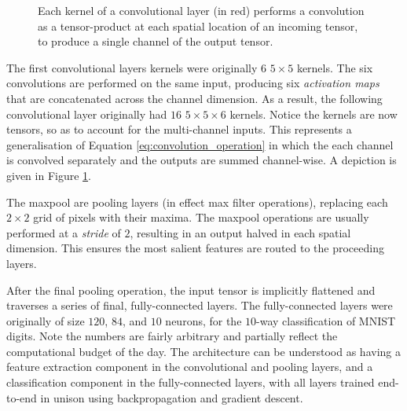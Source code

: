 \begin{figure}
\caption{Each kernel of a convolutional layer (in red) performs a convolution as a tensor-product at each spatial location of an incoming tensor, to produce a single channel of the output tensor.}
\label{fig:convolutional_layer}
\end{figure}

The first convolutional layers kernels were originally $6$ $5 \times 5$ kernels. The six convolutions are performed on the same input, producing six \emph{activation maps} that are concatenated across the channel dimension. As a result, the following convolutional layer originally had $16$ $5 \times 5 \times 6$ kernels. Notice the kernels are now tensors, so as to account for the multi-channel inputs. This represents a generalisation of Equation \ref{eq:convolution_operation} in which the each channel is convolved separately and the outputs are summed channel-wise. A depiction is given in Figure \ref{fig:convolutional_layer}.  

The maxpool are pooling layers (in effect max filter operations), replacing each $2\times2$ grid of pixels with their maxima. The maxpool operations are usually performed at a \emph{stride} of $2$, resulting in an output halved in each spatial dimension. This ensures the most salient features are routed to the proceeding layers.

After the final pooling operation, the input tensor is implicitly flattened and traverses a series of final, fully-connected layers. The fully-connected layers were originally of size $120$, $84$, and $10$ neurons, for the $10$-way classification of MNIST digits. Note the numbers are fairly arbitrary and partially reflect the computational budget of the day. The architecture can be understood as having a feature extraction component in the convolutional and pooling layers, and a classification component in the fully-connected layers, with all layers trained end-to-end in unison using backpropagation and gradient descent.



